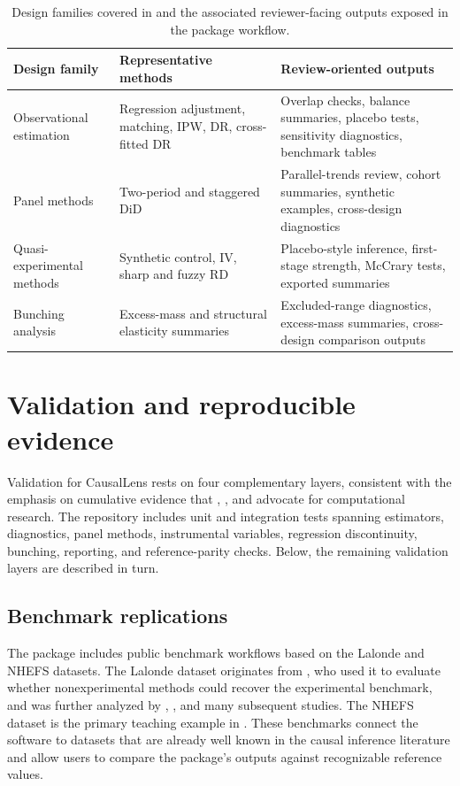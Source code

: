 \documentclass[article]{jss}
\begin{document}
\begin{table}[t!]
\centering
\footnotesize
\setlength{\tabcolsep}{4.5pt}
\begin{tabular}{L{3.0cm}L{5.1cm}L{5.3cm}}
\hline
Design family & Representative methods & Review-oriented outputs \\
\hline
Observational estimation & Regression adjustment, matching, IPW, DR, cross-fitted DR & Overlap checks, balance summaries, placebo tests, sensitivity diagnostics, benchmark tables \\
Panel methods & Two-period and staggered DiD & Parallel-trends review, cohort summaries, synthetic examples, cross-design diagnostics \\
Quasi-experimental methods & Synthetic control, IV, sharp and fuzzy RD & Placebo-style inference, first-stage strength, McCrary tests, exported summaries \\
Bunching analysis & Excess-mass and structural elasticity summaries & Excluded-range diagnostics, excess-mass summaries, cross-design comparison outputs \\
\hline
\end{tabular}
\caption{\label{tab:coverage} Design families covered in  and
the associated reviewer-facing outputs exposed in the package workflow.}
\end{table}



\section{Validation and reproducible evidence}\label{sec:validation}

Validation for CausalLens rests on four complementary layers, consistent
with the emphasis on cumulative evidence that \citet{Peng2011},
\citet{SandveEtAl2013}, and \citet{StoddenEtAl2016} advocate for
computational research. The repository includes unit and integration tests
spanning estimators, diagnostics, panel methods, instrumental variables,
regression discontinuity, bunching, reporting, and reference-parity checks.
Below, the remaining validation layers are described in turn.

\subsection{Benchmark replications}\label{sec:benchmarks}

The package includes public benchmark workflows based on the Lalonde
and NHEFS datasets. The Lalonde dataset originates from
\citet{Lalonde1986}, who used it to evaluate whether nonexperimental
methods could recover the experimental benchmark, and was further analyzed by
\citet{DehejiaWahba1999}, \citet{SmithTodd2005}, and many subsequent
studies. The NHEFS dataset is the primary teaching example in
\citet{HernanRobins2020}. These benchmarks connect the software to datasets
that are already well known in the causal inference literature and allow
users to compare the package's outputs against recognizable reference values.
\end{document}
